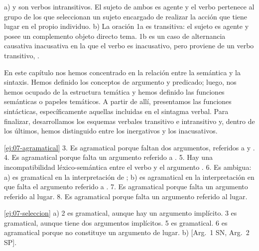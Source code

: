 \begin{ejercicio}
\begin{resuelto}
a)  y  son verbos intransitivos. El sujeto de
ambos es agente y el verbo pertenece al grupo de los que seleccionan un sujeto
encargado de realizar la acción que tiene lugar en el propio individuo. b) La
oración 1a es transitiva: el sujeto es agente y posee un complemento objeto
directo tema. 1b es un caso de alternancia causativa inacusativa en la que el
verbo es inacusativo, pero proviene de un verbo transitivo, .
\end{resuelto}
\end{ejercicio}

\begin{recuadro}
En este capítulo nos hemos concentrado en la relación entre la semántica y la
sintaxis. Hemos definido los conceptos de argumento y predicado; luego, nos
hemos ocupado de la estructura temática y hemos definido las funciones
semánticas o papeles temáticos. A partir de allí, presentamos las funciones
sintácticas, específicamente aquellas incluidas en el sintagma verbal. Para
finalizar, desarrollamos los esquemas verbales transitivo e intransitivo y,
dentro de los últimos, hemos distinguido entre los inergativos y los
inacusativos.
\end{recuadro}

\lecturasrecomendadas

\solucionario

\begin{solucion}{\ref{ej:07-agramatical}}
3. Es agramatical porque faltan dos argumentos, referidos a  y
. 4. Es agramatical porque falta un argumento
referido a . 5. Hay una incompatibilidad
léxico-semántica entre el verbo  y el argumento
. 6. Es ambigua: a) es gramatical en la interpretación de
; b) es agramatical en la interpretación en
que falta el argumento referido a . 7. Es
agramatical porque falta un argumento referido al lugar. 8. Es agramatical
porque falta un argumento referido al lugar.
\end{solucion}

\begin{solucion}{\ref{ej:07-seleccion}}
a) 2 es gramatical, aunque hay un argumento implícito. 3 es gramatical, aunque
tiene dos argumentos implícitos. 5 es gramatical. 6 es agramatical porque
 no constituye un argumento de lugar. b) 
[Arg.~1 SN, Arg.~2 SP].
\end{solucion}

